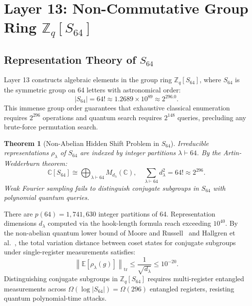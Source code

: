 \documentclass{ieeeaccess}
\newcommand{\Z}{\mathbb{Z}}
\newcommand{\norm}[1]{\left\|#1\right\|}
\newtheorem{theorem}{Theorem}
\newenvironment{proof}{\begin{IEEEproof}\IEEEQEDoff}{\end{IEEEproof}}
\begin{document}
\section{Layer 13: Non-Commutative Group Ring $\Z_q[S_{64}]$}
\label{sec:L13}

\subsection{Representation Theory of $S_{64}$}
Layer 13 constructs algebraic elements in the group ring $\Z_q[S_{64}]$, where $S_{64}$ is the symmetric group on 64 letters with astronomical order:
\begin{equation}
  |S_{64}| = 64! \approx 1.2689 \times 10^{89} \approx 2^{296.0}.
\end{equation}
This immense group order guarantees that exhaustive classical enumeration requires $2^{296}$ operations and quantum search requires $2^{148}$ queries, precluding any brute-force permutation search.

\begin{theorem}[Non-Abelian Hidden Shift Problem in $S_{64}$]
\label{thm:L13-s8}
Irreducible representations $\rho_\lambda$ of $S_{64}$ are indexed by integer partitions $\lambda \vdash 64$. By the Artin-Wedderburn theorem:
\begin{equation}
  \mathbb{C}[S_{64}] \cong \bigoplus_{\lambda \vdash 64} M_{d_\lambda}(\mathbb{C}), \quad \sum_{\lambda \vdash 64} d_\lambda^2 = 64! \approx 2^{296}.
\end{equation}
Weak Fourier sampling fails to distinguish conjugate subgroups in $S_{64}$ with polynomial quantum queries.
\end{theorem}
\begin{proof}
There are $p(64) = 1{,}741{,}630$ integer partitions of 64. Representation dimensions $d_\lambda$ computed via the hook-length formula reach exceeding $10^{40}$.
By the non-abelian quantum lower bound of Moore and Russell~\cite{MooreRussell2007} and Hallgren et al.~\cite{Hallgren2003}, the total variation distance between coset states for conjugate subgroups under single-register measurements satisfies:
\begin{equation}
  \norm{\mathbb{E}[\rho_\lambda(g)]}_{\mathrm{tr}} \leq \frac{1}{\sqrt{d_\lambda}} \leq 10^{-20}.
\end{equation}
Distinguishing conjugate subgroups in $\Z_q[S_{64}]$ requires multi-register entangled measurements across $\Omega(\log |S_{64}|) = \Omega(296)$ entangled registers, resisting quantum polynomial-time attacks.
\end{proof}
\end{document}
